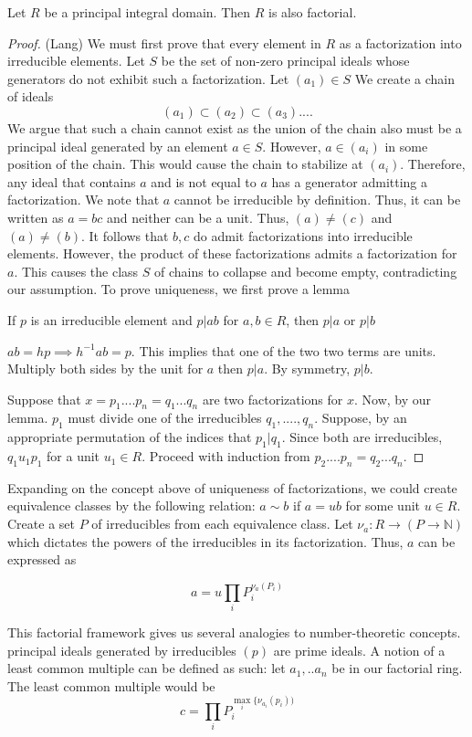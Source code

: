 \documentclass[main.tex]{subfiles}
\begin{document}
\begin{theorem}
 Let $R$ be a principal integral domain. Then $R$ is also factorial.
\end{theorem}

\begin{proof} (Lang)
We must first prove that every element in $R$ as a factorization into irreducible elements. Let $S$ be the set of non-zero principal ideals whose generators do not exhibit such a factorization. Let $(a_1) \in S$ We create a chain of ideals
$$(a_1) \subset (a_2) \subset (a_3).... $$
We argue that such a chain cannot exist as the union of the chain also must be a principal ideal generated by an element $a \in S$. However, $a \in (a_i)$ in some position of the chain. This would cause the chain to stabilize at $(a_i)$. Therefore, any ideal that contains $a$ and is not equal to $a$ has a generator admitting a factorization. We note that $a$ cannot be irreducible by definition.
Thus, it can be written as $a = bc$ and neither can be a unit. Thus, $(a) \neq (c)$ and $(a) \neq (b)$. It follows that $b,c$ do admit factorizations into irreducible elements. However, the product of these factorizations admits a factorization for $a$. This causes the class $S$ of chains to collapse and become empty, contradicting our assumption. 
To prove uniqueness, we first prove a lemma
\begin{lemma}
If $p$ is an irreducible element and $p|ab$  for $a,b \in R$, then $p|a$ or $p|b$
\end{lemma}
$ab = hp \implies h^{-1}ab = p$. This implies that one of the two two terms are units. Multiply both sides by the unit for $a$ then $p|a$. By symmetry, $p|b$.

Suppose that $x = p_1 .... p_n = q_1 ... q_n$ are two factorizations for $x$. Now, by our lemma. $p_1$ must divide one of the irreducibles $q_1,....,q_n$. Suppose, by an appropriate permutation of the indices that $p_1 | q_1$. Since both are irreducibles, $q_1  u_1p_1$ for a unit $u_1 \in R$. Proceed with induction from
$p_2....p_n = q_2...q_n$.
\end{proof}

Expanding on the concept above of uniqueness of factorizations, we could create equivalence classes by the following relation: $a \sim b$ if $a = ub$ for some unit $u \in R$. Create a set $P$ of irreducibles from each equivalence class. Let $\nu_a : R \rightarrow (P \rightarrow \mathbb{N})$ which dictates the powers of the irreducibles in its factorization. Thus, $a$ can be expressed as 

$$ a = u \prod_i P_i^{\nu_a(P_i)} $$

This factorial framework gives us several analogies to number-theoretic concepts.
principal ideals generated by irreducibles $(p)$ are prime ideals. A notion of a least common multiple can be defined as such: let $a_1,..a_n $ be in our factorial ring. The least common multiple would be $$c = \prod_i P_i^{\max_i \{\nu_{a_i}(p_i))} $$ 
\end{document}
